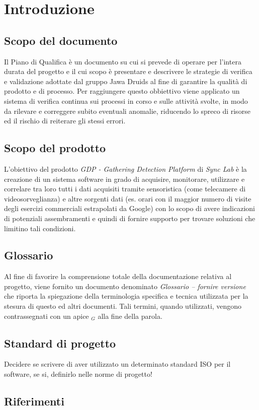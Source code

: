 \chapter{Introduzione}\label{Introduzione}

\section{Scopo del documento}
Il Piano di Qualifica è un documento su cui si prevede di operare per l’intera durata del progetto 
e il cui scopo è presentare e descrivere le strategie di verifica e validazione adottate 
dal gruppo Jawa Druids al fine di garantire la qualità di prodotto e di processo.  
Per raggiungere questo obbiettivo viene applicato un sistema di verifica continua sui processi in corso e 
sulle attività svolte, in modo da rilevare e correggere subito eventuali anomalie, riducendo lo spreco di risorse 
ed il rischio di reiterare gli stessi errori.
\section{Scopo del prodotto}
L'obiettivo del prodotto \textit{GDP - Gathering Detection Platform} di \textit{Sync Lab} è la creazione di un sistema software in 
grado di acquisire, monitorare, utilizzare e correlare tra loro tutti i dati acquisiti tramite sensoristica (come telecamere di videosorveglianza)
e altre sorgenti dati (es. orari con il maggior numero di visite degli esercizi commerciali estrapolati da Google) con lo
scopo di avere indicazioni di potenziali assembramenti e quindi di fornire supporto per trovare soluzioni che limitino tali condizioni.
\section{Glossario}
Al fine di favorire la comprensione totale della documentazione relativa al progetto, viene fornito un documento denominato \textit{Glossario -- fornire versione}
che riporta la spiegazione della terminologia specifica e tecnica utilizzata per la stesura di questo ed altri documenti.
Tali termini, quando utilizzati, vengono contrassegnati con un apice $_G$ alla fine della parola.
\section{Standard di progetto}
Decidere se scrivere di aver utilizzato un determinato standard ISO per il software, se si, definirlo nelle norme di progetto!
\section{Riferimenti}
